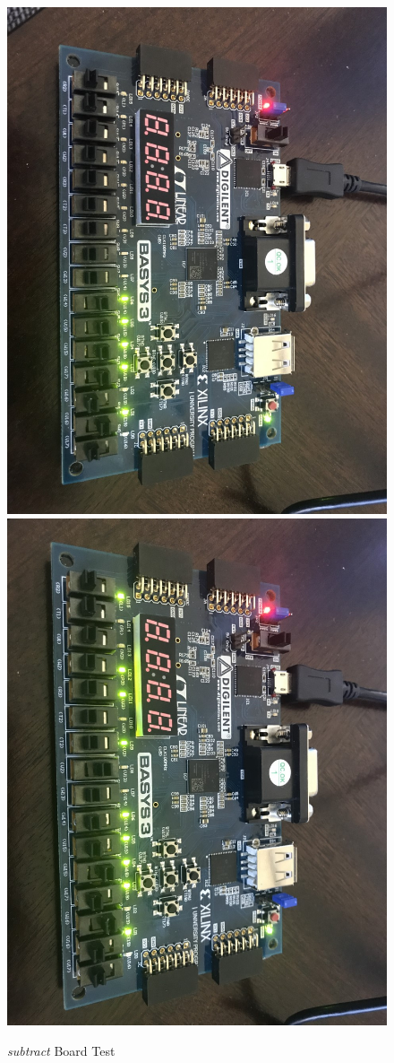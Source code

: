 \documentclass[11pt]{article}
\begin{document}
\begin{figure}[ht]\centering
	\includegraphics[angle=90, width=.8\textwidth]{sub1}
	\includegraphics[angle=90, width=.8\textwidth]{sub2}
	\caption{\textit{subtract} Board Test}
	\label{fig:sim_with_table}
\end{figure}
\end{document}
